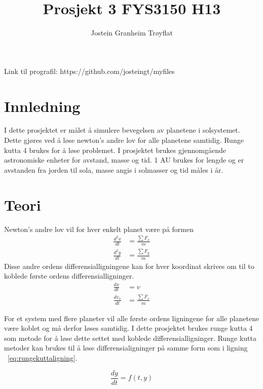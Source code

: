 \documentclass[a4paper, 12pt]{article}
\title{Prosjekt 3 FYS3150 H13}
\date{}
\author{Jostein Granheim Trøyflat}
\begin{document}
\maketitle

Link til prografil:
https://github.com/josteingt/myfiles


\section*{Innledning}
I dette prosjektet er målet å simulere bevegelsen av planetene i solsystemet. Dette gjøres ved å løse newton's andre lov for alle planetene samtidig. Runge kutta 4 brukes for å løse problemet. I prosjektet brukes gjennomgående astronomiske enheter for avstand, masse og tid. 1 AU brukes for lengde og er avstanden fra jorden til sola, masse angis i solmasser og tid måles i år. 

\newpage
\section*{Teori}
Newton's andre lov vil for hver enkelt planet være på formen
\begin{equation}
\begin{aligned}
\frac{d^2x}{dt} &= \frac{\sum F_x}{m}\\
\frac{d^2y}{dt} &= \frac{\sum F_y}{m}
\end{aligned}
\end{equation}
 Disse andre ordens differensialligningene kan for hver koordinat skrives om til to koblede første ordens differensialligninger.
 \begin{equation}
 \begin{aligned}
 \frac{dx}{dt} &= v\\
 \frac{dv_x}{dt} &= \frac{\sum F_x}{m}
 \end{aligned}
 \end{equation}
 
 For et system med flere planeter vil alle første ordens ligningene for alle planetene være koblet og må derfor løses samtidig. I dette prosjektet brukes runge kutta 4 som metode for å løse dette settet med koblede differensialligninger. 
 Runge kutta metoder kan brukes til å løse differensialigninger på samme form som i ligning 
 ~\ref{eq:rungekuttaligning}.
 
 \begin{equation}
 \label{eq:rungekuttaligning}
 \frac{dy}{dt} = f(t,y)
 \end{equation}
 
\end{document}
